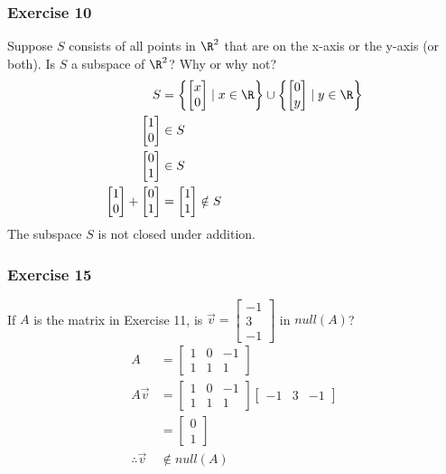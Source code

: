 \documentclass[letterpaper, 12pt]{math}
\begin{document}
\subsubsection*{Exercise 10}
Suppose \( S \) consists of all points in \( \R^2 \) that are on the x-axis or
the y-axis (or both). Is \( S \) a subspace of \( \R^2 \)? Why or why not?
\begin{align*}
  S &= \left\{\begin{bmatrix}x \\ 0\end{bmatrix}\mid x\in\R\right\}\cup
  \left\{\begin{bmatrix}0 \\ y\end{bmatrix}\mid y\in\R\right\} \\
  \begin{bmatrix}1 \\ 0\end{bmatrix} &\in S \\
  \begin{bmatrix}0 \\ 1\end{bmatrix} &\in S \\
  \begin{bmatrix}1 \\ 0\end{bmatrix}+\begin{bmatrix}0 \\ 1\end{bmatrix} &=
    \begin{bmatrix}1 \\ 1\end{bmatrix}\notin S
\end{align*}
The subspace \( S \) is not closed under addition.

\subsubsection*{Exercise 15}
If \( A \) is the matrix in Exercise 11, is \( \vec{v} = \begin{bmatrix}
-1 \\ 3 \\ -1\end{bmatrix} \) in \( null(A) \)?
\begin{align*}
  A &= \begin{bmatrix}
    1 & 0 & -1 \\
    1 & 1 & 1
  \end{bmatrix} \\
  A\vec{v} &= \begin{bmatrix}
    1 & 0 & -1 \\
    1 & 1 & 1
  \end{bmatrix}\begin{bmatrix}-1 & 3 & -1\end{bmatrix} \\
  &= \begin{bmatrix}0 \\ 1\end{bmatrix} \\
  \therefore \vec{v} &\notin null(A)
\end{align*}
\end{document}
